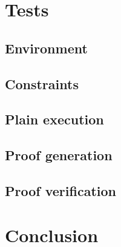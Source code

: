\documentclass[12pt, a4paper]{report}
\begin{document}
\chapter{Tests}\label{chap:tests}

\section{Environment}\label{sec:environment}

\section{Constraints}\label{sec:constraints}

\section{Plain execution}\label{sec:plain}

\section{Proof generation}\label{sec:proofgen}

\section{Proof verification}\label{sec:proofver}

\chapter{Conclusion}\label{chap:conclusion}
\end{document}
